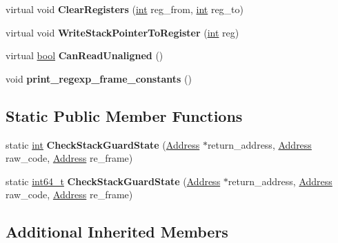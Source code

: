 \begin{DoxyCompactItemize}
virtual void {\bfseries Clear\+Registers} (\mbox{\hyperlink{classint}{int}} reg\+\_\+from, \mbox{\hyperlink{classint}{int}} reg\+\_\+to)
\item 
\mbox{\label{classv8_1_1internal_1_1RegExpMacroAssemblerMIPS_a842cf0974df70e03bbfeef991faa5840}} 
virtual void {\bfseries Write\+Stack\+Pointer\+To\+Register} (\mbox{\hyperlink{classint}{int}} reg)
\item 
\mbox{\label{classv8_1_1internal_1_1RegExpMacroAssemblerMIPS_adc3f178837a4dedd136bb43cbdebc165}} 
virtual \mbox{\hyperlink{classbool}{bool}} {\bfseries Can\+Read\+Unaligned} ()
\item 
\mbox{\label{classv8_1_1internal_1_1RegExpMacroAssemblerMIPS_a21ca4a1bae5e0a36e398659f62673b02}} 
void {\bfseries print\+\_\+regexp\+\_\+frame\+\_\+constants} ()
\end{DoxyCompactItemize}
\subsection*{Static Public Member Functions}
\begin{DoxyCompactItemize}
\item 
\mbox{\label{classv8_1_1internal_1_1RegExpMacroAssemblerMIPS_a83e0dd7792d9fa019807774d23ed6f3c}} 
static \mbox{\hyperlink{classint}{int}} {\bfseries Check\+Stack\+Guard\+State} (\mbox{\hyperlink{classuintptr__t}{Address}} $\ast$return\+\_\+address, \mbox{\hyperlink{classuintptr__t}{Address}} raw\+\_\+code, \mbox{\hyperlink{classuintptr__t}{Address}} re\+\_\+frame)
\item 
\mbox{\label{classv8_1_1internal_1_1RegExpMacroAssemblerMIPS_a5b2c15da4f1ba89d4fd921a516e195cf}} 
static \mbox{\hyperlink{classint64__t}{int64\+\_\+t}} {\bfseries Check\+Stack\+Guard\+State} (\mbox{\hyperlink{classuintptr__t}{Address}} $\ast$return\+\_\+address, \mbox{\hyperlink{classuintptr__t}{Address}} raw\+\_\+code, \mbox{\hyperlink{classuintptr__t}{Address}} re\+\_\+frame)
\end{DoxyCompactItemize}
\subsection*{Additional Inherited Members}



